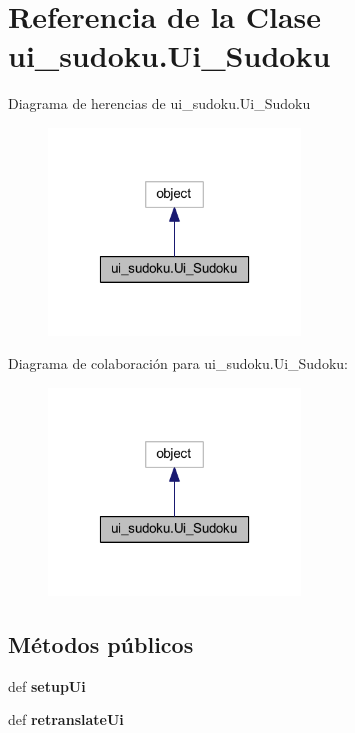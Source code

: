 \section{Referencia de la Clase ui\-\_\-sudoku.\-Ui\-\_\-\-Sudoku}
\label{classui__sudoku_1_1_ui___sudoku}


Diagrama de herencias de ui\-\_\-sudoku.\-Ui\-\_\-\-Sudoku\nopagebreak
\begin{figure}[H]
\begin{center}
\leavevmode
\includegraphics[width=190pt]{classui__sudoku_1_1_ui___sudoku__inherit__graph}
\end{center}
\end{figure}


Diagrama de colaboración para ui\-\_\-sudoku.\-Ui\-\_\-\-Sudoku\-:\nopagebreak
\begin{figure}[H]
\begin{center}
\leavevmode
\includegraphics[width=190pt]{classui__sudoku_1_1_ui___sudoku__coll__graph}
\end{center}
\end{figure}
\subsection*{Métodos públicos}
\begin{DoxyCompactItemize}
\item 
def {\bfseries setup\-Ui}\label{classui__sudoku_1_1_ui___sudoku_a975558d747bd8f057dc8361dbee4f6a8}

\item 
def {\bfseries retranslate\-Ui}\label{classui__sudoku_1_1_ui___sudoku_a018e851ec57f840bb31da96699917a19}

\end{DoxyCompactItemize}
